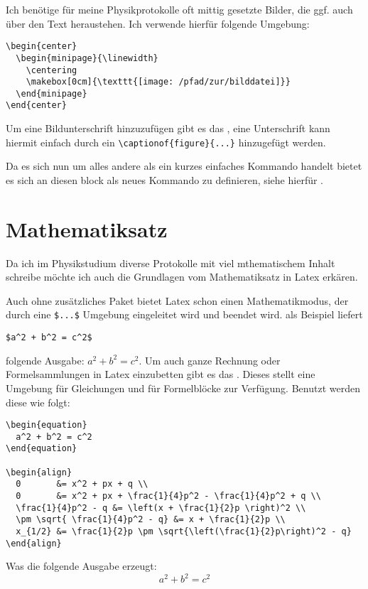 Ich benötige für meine Physikprotokolle oft mittig gesetzte Bilder, die ggf. auch über den Text heraustehen.
Ich verwende hierfür folgende Umgebung:
\begin{verbatim}
\begin{center}
  \begin{minipage}{\linewidth}
    \centering
    \makebox[0cm]{\texttt{[image: /pfad/zur/bilddatei]}}
  \end{minipage}
\end{center}
\end{verbatim}

Um eine Bildunterschrift hinzuzufügen gibt es das , eine Unterschrift kann hiermit einfach
durch ein \verb+\captionof{figure}{...}+ hinzugefügt werden.

Da es sich nun um alles andere als ein kurzes einfaches Kommando handelt bietet es sich an diesen block als neues
Kommando zu definieren, siehe hierfür .

\section{Mathematiksatz}
Da ich im Physikstudium diverse Protokolle mit viel mthematischem Inhalt schreibe möchte ich auch die
Grundlagen vom Mathematiksatz in Latex erkären.

Auch ohne zusätzliches Paket bietet Latex schon einen Mathematikmodus, der durch eine \verb+$...$+
Umgebung eingeleitet wird und beendet wird. als Beispiel liefert
\begin{verbatim}
$a^2 + b^2 = c^2$
\end{verbatim}
folgende Ausgabe:
$a^2 + b^2 = c^2$. Um auch ganze Rechnung oder Formelsammlungen in Latex einzubetten gibt es das
. Dieses stellt eine Umgebung für Gleichungen und für Formelblöcke zur Verfügung.
Benutzt werden diese wie folgt:
\begin{verbatim}
\begin{equation}
  a^2 + b^2 = c^2
\end{equation}

\begin{align}
  0       &= x^2 + px + q \\
  0       &= x^2 + px + \frac{1}{4}p^2 - \frac{1}{4}p^2 + q \\
  \frac{1}{4}p^2 - q &= \left(x + \frac{1}{2}p \right)^2 \\
  \pm \sqrt{ \frac{1}{4}p^2 - q} &= x + \frac{1}{2}p \\
  x_{1/2} &= \frac{1}{2}p \pm \sqrt{\left(\frac{1}{2}p\right)^2 - q}  
\end{align}
\end{verbatim}
Was die folgende Ausgabe erzeugt:
\begin{equation}
  a^2 + b^2 = c^2
\end{equation}

